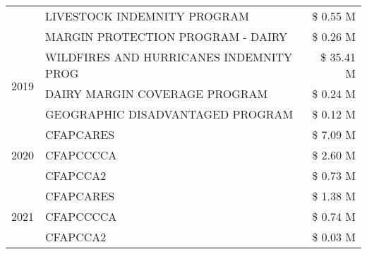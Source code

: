 \begin{tabular}{llr}
 & LIVESTOCK INDEMNITY PROGRAM & \$ 0.55 M \\
 & MARGIN PROTECTION PROGRAM - DAIRY & \$ 0.26 M \\
\cline{1-3}
\multirow[t]{3}{*}{2019} & WILDFIRES AND HURRICANES INDEMNITY PROG & \$ 35.41 M \\
 & DAIRY MARGIN COVERAGE PROGRAM & \$ 0.24 M \\
 & GEOGRAPHIC DISADVANTAGED PROGRAM & \$ 0.12 M \\
\cline{1-3}
\multirow[t]{3}{*}{2020} & CFAPCARES & \$ 7.09 M \\
 & CFAPCCCCA & \$ 2.60 M \\
 & CFAPCCA2 & \$ 0.73 M \\
\cline{1-3}
\multirow[t]{3}{*}{2021} & CFAPCARES & \$ 1.38 M \\
 & CFAPCCCCA & \$ 0.74 M \\
 & CFAPCCA2 & \$ 0.03 M \\
\cline{1-3}
\bottomrule
\end{tabular}
